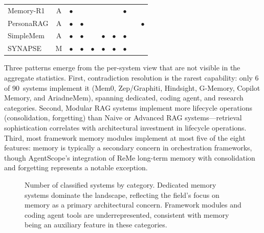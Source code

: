 \begin{table}[!t]
\begin{tabular}{@{}lc cccccccc@{}}
Memory-R1            & A & $\bullet$ &           &           &           &           & $\bullet$ &           &           \\
PersonaRAG           & A & $\bullet$ & $\bullet$ &           &           &           &           &           & $\bullet$ \\
SimpleMem            & A & $\bullet$ & $\bullet$ &           & $\bullet$ & $\bullet$ & $\bullet$ &           &           \\
SYNAPSE              & M & $\bullet$ & $\bullet$ & $\bullet$ & $\bullet$ & $\bullet$ & $\bullet$ &           &           \\
\bottomrule
\end{tabular}
\end{table}

Three patterns emerge from the per-system view that are not visible in the
aggregate statistics.  First, contradiction resolution is the rarest
capability: only 6 of 90~systems implement it (Mem0, Zep/Graphiti,
Hindsight, G-Memory, Copilot Memory, and AriadneMem), spanning dedicated,
coding agent, and research categories.
Second, Modular RAG systems implement more lifecycle operations
(consolidation, forgetting) than Naive or Advanced RAG systems---retrieval
sophistication correlates with architectural investment in lifecycle
operations.  Third, most framework memory modules implement at most five of the
eight features: memory is typically a secondary concern in orchestration
frameworks, though AgentScope's integration of ReMe long-term memory with
consolidation and forgetting represents a notable exception.

\begin{figure}[!t]
\centering
{}
\caption{Number of classified systems by category.  Dedicated memory systems
dominate the landscape, reflecting the field's focus on memory as a primary
architectural concern.  Framework modules and coding agent tools are
underrepresented, consistent with memory being an auxiliary feature in
these categories.}
\label{fig:category-scores}
\end{figure}

